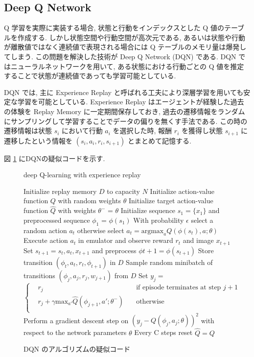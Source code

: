 \documentclass[12pt]{jarticle}
\begin{document}
\subsection{Deep Q Network}
Q 学習を実際に実装する場合, 状態と行動をインデックスとした Q 値のテーブルを作成する. しかし状態空間や行動空間が高次元である, あるいは状態や行動が離散値ではなく連続値で表現される場合には Q テーブルのメモリ量は爆発してしまう. この問題を解決した技術が Deep Q Network (DQN) \cite{DQN} である.
 DQN ではニューラルネットワークを用いて, ある状態における行動ごとの Q 値を推定することで状態が連続値であっても学習可能としている.
 \par
 DQN では, 主に Experience Replay と呼ばれる工夫により深層学習を用いても安定な学習を可能としている. 
 Experience Replay はエージェントが経験した過去の体験を Replay Memory に一定期間保存しておき, 過去の遷移情報をランダムにサンプリングして学習することでデータの偏りを無くす手法である. この時の遷移情報は状態 $s_i$ において行動 $a_i$ を選択した時, 報酬 $r_i$ を獲得し状態 $s_{i+1}$ に遷移したという情報を $(s_i, a_i, r_i, s_{i+1})$ とまとめて記憶する. \par
 図 \ref{alg:DQN} にDQNの疑似コードを示す.
 \begin{figure}[H]
  \begin{algorithm}[H]
      \caption{
        deep Q-learning with experience replay
        }
      \begin{algorithmic}[1] 
      \STATE Initialize replay memory $D$ to capacity $N$
      \STATE Initialize action-value function $Q$ with random weights $\theta$
      \STATE Initialize target action-value function $\hat{Q}$ with weights $\theta^{-}$ = $\theta$
      \STATE Initialize sequence $s_{1} = \{x_1\}$ and preprocessed sequence $\phi_1$ = $\phi(s_1)$ 
      \STATE With probability $\epsilon$ select a random action $a_{t}$
      \STATE otherwise select $a_t = \mathrm{argmax}_{a}Q(\phi(s_{t}),a; \theta)$
      \STATE Execute action $a_t$ in emulator and observe reward $r_t$ and image $x_{t+1}$
      \STATE Set $s_{t+1} = s_t,a_t,x_{t+1}$ and preprocess $\phi{t+1} = \phi(s_{t+1}) $
      \STATE Store transition $(\phi_t,a_t,r_t,\phi_{t+1})$ in $D$
      \STATE Sample random minibatch of transitions $(\phi_j,a_j,r_j,w_{j+1})$ from $D$
      \STATE Set $y_j = $ $\left\{
        \begin{aligned}
            &r_j \quad & \text{if episode terminates at step } j + 1 \\
            &r_j + \gamma \mathrm{max}_{a'} \hat{Q}(\phi_{j+1},a';\theta^{-}) \quad  & \text{otherwise}\\
        \end{aligned}
      \right.     $   
      \STATE Perform a gradient descent step on $(y_j - Q(\phi_j,a_j;\theta))^2$ with respect to the network parameters $\theta$
      \STATE Every C steps reset $\hat{Q} = Q$
        
      \ENDFOR
      \ENDFOR
      \end{algorithmic}
  \end{algorithm}
  \caption{DQN のアルゴリズムの疑似コード \cite{DQN_algorithm}}
  \label{alg:DQN}
  \end{figure}
\end{document}
